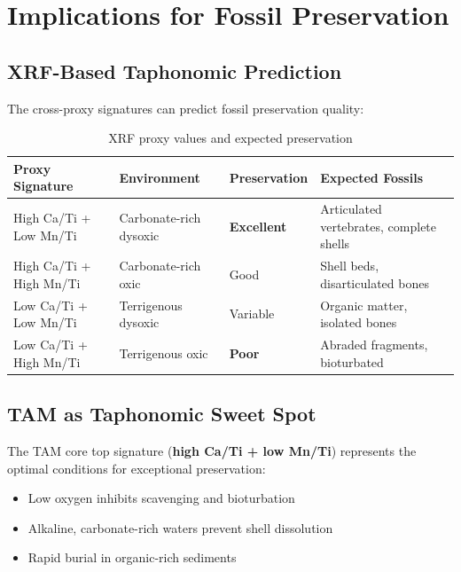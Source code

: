 \documentclass[11pt,a4paper]{article}
\begin{document}
\section{Implications for Fossil Preservation}

\subsection{XRF-Based Taphonomic Prediction}

The cross-proxy signatures can predict fossil preservation quality:

\begin{table}[H]
\centering
\caption{XRF proxy values and expected preservation}
\begin{tabular}{llll}
\toprule
\textbf{Proxy Signature} & \textbf{Environment} & \textbf{Preservation} & \textbf{Expected Fossils} \\
\midrule
High Ca/Ti + Low Mn/Ti & Carbonate-rich dysoxic & \textbf{Excellent} & Articulated vertebrates, complete shells \\
High Ca/Ti + High Mn/Ti & Carbonate-rich oxic & Good & Shell beds, disarticulated bones \\
Low Ca/Ti + Low Mn/Ti & Terrigenous dysoxic & Variable & Organic matter, isolated bones \\
Low Ca/Ti + High Mn/Ti & Terrigenous oxic & \textbf{Poor} & Abraded fragments, bioturbated \\
\bottomrule
\end{tabular}
\end{table}

\subsection{TAM as Taphonomic Sweet Spot}

The TAM core top signature (\textbf{high Ca/Ti + low Mn/Ti}) represents the optimal conditions for exceptional preservation:
\begin{itemize}
    \item Low oxygen inhibits scavenging and bioturbation
    \item Alkaline, carbonate-rich waters prevent shell dissolution
    \item Rapid burial in organic-rich sediments
\end{itemize}
\end{document}
